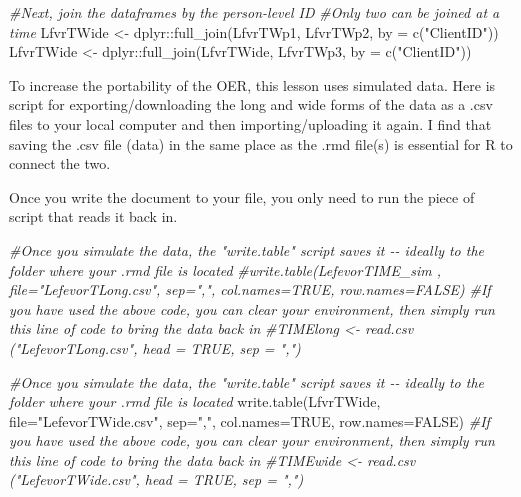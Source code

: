 \documentclass[
  11pt,
]{book}
\newenvironment{Shaded}{\begin{snugshade}}{\end{snugshade}}
\newcommand{\AttributeTok}[1]{\textcolor[rgb]{0.77,0.63,0.00}{#1}}
\newcommand{\CommentTok}[1]{\textcolor[rgb]{0.56,0.35,0.01}{\textit{#1}}}
\newcommand{\ConstantTok}[1]{\textcolor[rgb]{0.00,0.00,0.00}{#1}}
\newcommand{\FunctionTok}[1]{\textcolor[rgb]{0.00,0.00,0.00}{#1}}
\newcommand{\NormalTok}[1]{#1}
\newcommand{\OtherTok}[1]{\textcolor[rgb]{0.56,0.35,0.01}{#1}}
\newcommand{\SpecialCharTok}[1]{\textcolor[rgb]{0.00,0.00,0.00}{#1}}
\newcommand{\StringTok}[1]{\textcolor[rgb]{0.31,0.60,0.02}{#1}}
\begin{document}
\begin{Shaded}
\begin{Highlighting}[]
\CommentTok{\#Next, join the dataframes by the person{-}level ID}
\CommentTok{\#Only two can be joined at a time}
\NormalTok{LfvrTWide }\OtherTok{\textless{}{-}}\NormalTok{ dplyr}\SpecialCharTok{::}\FunctionTok{full\_join}\NormalTok{(LfvrTWp1, LfvrTWp2, }\AttributeTok{by =} \FunctionTok{c}\NormalTok{(}\StringTok{"ClientID"}\NormalTok{))}
\NormalTok{LfvrTWide }\OtherTok{\textless{}{-}}\NormalTok{ dplyr}\SpecialCharTok{::}\FunctionTok{full\_join}\NormalTok{(LfvrTWide, LfvrTWp3,  }\AttributeTok{by =} \FunctionTok{c}\NormalTok{(}\StringTok{"ClientID"}\NormalTok{))}
\end{Highlighting}
\end{Shaded}

To increase the portability of the OER, this lesson uses simulated data. Here is script for exporting/downloading the long and wide forms of the data as a .csv files to your local computer and then importing/uploading it again. I find that saving the .csv file (data) in the same place as the .rmd file(s) is essential for R to connect the two.

Once you write the document to your file, you only need to run the piece of script that reads it back in.

\begin{Shaded}
\begin{Highlighting}[]
\CommentTok{\#Once you simulate the data, the "write.table" script saves it {-}{-} ideally to the folder where your .rmd file is located}
\CommentTok{\#write.table(LefevorTIME\_sim , file="LefevorTLong.csv", sep=",", col.names=TRUE, row.names=FALSE)}
\CommentTok{\#If you have used the above code, you can clear your environment, then simply run this line of code to bring the data back in}
\CommentTok{\#TIMElong \textless{}{-} read.csv ("LefevorTLong.csv", head = TRUE, sep = ",")}
\end{Highlighting}
\end{Shaded}

\begin{Shaded}
\begin{Highlighting}[]
\CommentTok{\#Once you simulate the data, the "write.table" script saves it {-}{-} ideally to the folder where your .rmd file is located}
\FunctionTok{write.table}\NormalTok{(LfvrTWide, }\AttributeTok{file=}\StringTok{"LefevorTWide.csv"}\NormalTok{, }\AttributeTok{sep=}\StringTok{","}\NormalTok{, }\AttributeTok{col.names=}\ConstantTok{TRUE}\NormalTok{, }\AttributeTok{row.names=}\ConstantTok{FALSE}\NormalTok{)}
\CommentTok{\#If you have used the above code, you can clear your environment, then simply run this line of code to bring the data back in}
\CommentTok{\#TIMEwide \textless{}{-} read.csv ("LefevorTWide.csv", head = TRUE, sep = ",")}
\end{Highlighting}
\end{Shaded}
\end{document}

